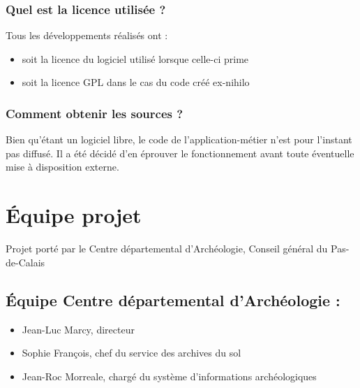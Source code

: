 \documentclass[letterpaper,10pt,french]{sphinxmanual}
\begin{document}
\subsection{Quel est la licence utilisée ?}
\label{manuel/questions_frequentes:quel-est-la-licence-utilisee}
Tous les développements réalisés ont :
\begin{itemize}
\item {} 
soit la licence du logiciel utilisé lorsque celle-ci prime

\item {} 
soit la licence GPL dans le cas du code créé ex-nihilo

\end{itemize}


\subsection{Comment obtenir les sources ?}
\label{manuel/questions_frequentes:comment-obtenir-les-sources}
Bien qu'étant un logiciel libre, le code de l'application-métier n'est pour l'instant pas diffusé. Il a été décidé d'en éprouver le fonctionnement avant toute éventuelle mise à disposition externe.


\chapter{Équipe projet}
\label{manuel/participants::doc}\label{manuel/participants:equipe-projet}
Projet porté par le Centre départemental d’Archéologie, Conseil général du Pas-de-Calais


\section{Équipe Centre départemental d’Archéologie :}
\label{manuel/participants:equipe-centre-departemental-darcheologie}\begin{itemize}
\item {} 
Jean-Luc Marcy, directeur

\item {} 
Sophie François, chef du service des archives du sol

\item {} 
Jean-Roc Morreale, chargé du système d’informations archéologiques

\end{itemize}
\end{document}
